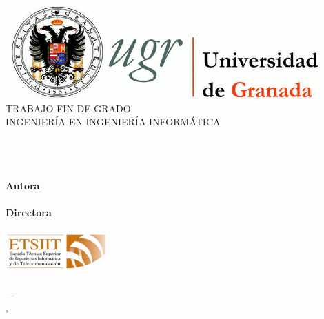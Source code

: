 \begin{titlepage}
 
 
\newlength{\centeroffset}
\setlength{\centeroffset}{-0.5\oddsidemargin}
\addtolength{\centeroffset}{0.5\evensidemargin}
\thispagestyle{empty}

\noindent\hspace*{\centeroffset}\begin{minipage}{\textwidth}

\centering
\includegraphics[width=0.9\textwidth]{imagenes/logo_ugr.jpg}\\[1.4cm]

\textsc{ \Large TRABAJO FIN DE GRADO\\[0.2cm]}
\textsc{ INGENIERÍA EN INGENIERÍA INFORMÁTICA}\\[2cm]
% 
{\Huge\bfseries \myTitle}\\[0.5cm]
{\Huge\bfseries \myTitleone}\\[0.5cm]
{\Huge\bfseries \myTitletwo}\\[0.5cm]
{\Huge\bfseries \myTitlethree}
\end{minipage}

\vspace{2cm}
\noindent\hspace*{\centeroffset}\begin{minipage}{\textwidth}
\centering

\textbf{Autora}\\ {\myName}\\[2.5ex]
\textbf{Directora}\\
{\myProf}\\[1.5cm]
\includegraphics[width=0.3\textwidth]{imagenes/etsiit_logo.png}\\[0.1cm]
\textsc{\myFaculty}\\
\textsc{---}\\
\textsc{\myLocation, \myTime}
\end{minipage}
\end{titlepage}


